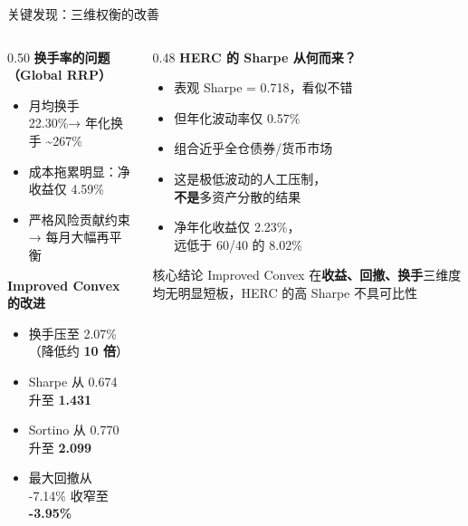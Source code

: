 \documentclass[aspectratio=169,11pt]{beamer}
\newcommand{\globalNetReturn}{4.59\%}
\newcommand{\globalSharpe}{0.674}
\newcommand{\globalSortino}{0.770}
\newcommand{\globalMaxDD}{-7.14\%}
\newcommand{\globalMonthlyTurnover}{22.30\%}
\newcommand{\improvedSharpe}{1.431}
\newcommand{\improvedSortino}{2.099}
\newcommand{\improvedMaxDD}{-3.95\%}
\newcommand{\improvedMonthlyTurnover}{2.07\%}
\newcommand{\hercNetReturn}{2.23\%}
\newcommand{\hercVolatility}{0.57\%}
\newcommand{\hercSharpe}{0.718}
\newcommand{\sixtyFortyNetReturn}{8.02\%}
\begin{document}
\begin{frame}{关键发现：三维权衡的改善}
  \begin{columns}[T]
    \begin{column}{0.50\textwidth}
      \textbf{换手率的问题（Global RRP）}
      \begin{itemize}
        \item 月均换手 \globalMonthlyTurnover → 年化换手 \textasciitilde267\%
        \item 成本拖累明显：净收益仅 \globalNetReturn
        \item 严格风险贡献约束 → 每月大幅再平衡
      \end{itemize}
      \vspace{0.5em}
      \textbf{Improved Convex 的改进}
      \begin{itemize}
        \item 换手压至 \improvedMonthlyTurnover（降低约 \textbf{10 倍}）
        \item Sharpe 从 \globalSharpe{} 升至 \textbf{\improvedSharpe}
        \item Sortino 从 \globalSortino{} 升至 \textbf{\improvedSortino}
        \item 最大回撤从 \globalMaxDD{} 收窄至 \textbf{\improvedMaxDD}
      \end{itemize}
    \end{column}
    \begin{column}{0.48\textwidth}
      \textbf{HERC 的 Sharpe 从何而来？}
      \begin{itemize}
        \item 表观 Sharpe = \hercSharpe，看似不错
        \item 但年化波动率仅 \hercVolatility
        \item 组合近乎全仓债券/货币市场
        \item 这是\alert{极低波动的人工压制}，\\
              \textbf{不是}多资产分散的结果
        \item 净年化收益仅 \hercNetReturn，\\
              远低于 60/40 的 \sixtyFortyNetReturn
      \end{itemize}
      \vspace{0.3em}
      \begin{block}{核心结论}
        Improved Convex 在\textbf{收益、回撤、换手}三维度均无明显短板，HERC 的高 Sharpe 不具可比性
      \end{block}
    \end{column}
  \end{columns}
\end{frame}
\end{document}
